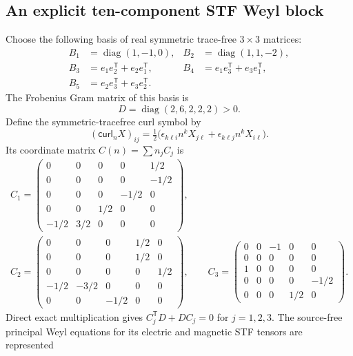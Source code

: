 \documentclass[11pt,a4paper]{article}
\begin{document}
\subsection{An explicit ten-component STF Weyl block}
Choose the following basis of
real symmetric trace-free
$3\times3$ matrices:
\[
\begin{aligned}
B_1&=\operatorname{diag}(1,-1,0),
&B_2&=\operatorname{diag}(1,1,-2),\\
B_3&=e_1e_2^{\mathsf T}+e_2e_1^{\mathsf T},
&B_4&=e_1e_3^{\mathsf T}+e_3e_1^{\mathsf T},\\
B_5&=e_2e_3^{\mathsf T}+e_3e_2^{\mathsf T}.
\end{aligned}
\]
The Frobenius Gram matrix of this
basis is
\begin{equation}\label{eq:Gram}
D=\operatorname{diag}(2,6,2,2,2)>0.
\end{equation}
Define the symmetric-tracefree
curl symbol by
\[
(\mathsf{curl}_n X)_{ij}
=\tfrac12\bigl(
\epsilon_{k\ell i}n^kX_{j\ell}
+\epsilon_{k\ell j}n^kX_{i\ell}
\bigr).
\]
Its coordinate matrix
$C(n)=\sum n_jC_j$ is
\begin{equation}\label{eq:C-mats}
\begin{gathered}
C_1=
\begin{pmatrix}
0&0&0&0&1/2\\
0&0&0&0&-1/2\\
0&0&0&-1/2&0\\
0&0&1/2&0&0\\
-1/2&3/2&0&0&0
\end{pmatrix},\\[3pt]
C_2=
\begin{pmatrix}
0&0&0&1/2&0\\
0&0&0&1/2&0\\
0&0&0&0&1/2\\
-1/2&-3/2&0&0&0\\
0&0&-1/2&0&0
\end{pmatrix},\qquad
C_3=
\begin{pmatrix}
0&0&-1&0&0\\
0&0&0&0&0\\
1&0&0&0&0\\
0&0&0&0&-1/2\\
0&0&0&1/2&0
\end{pmatrix}.
\end{gathered}
\end{equation}
Direct exact multiplication gives
$C_j^{\mathsf T}D+DC_j=0$
for $j=1,2,3$.
The source-free principal Weyl
equations for its electric and
magnetic STF tensors are represented
\end{document}
